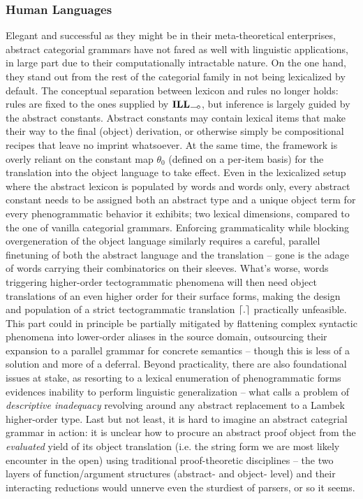 \subsubsection{Human Languages}
Elegant and successful as they might be in their meta-theoretical enterprises, abstract categorial grammars have not fared as well with linguistic applications, in large part due to their computationally intractable nature.
On the one hand, they stand out from the rest of the categorial family in not being lexicalized by default.
The conceptual separation between lexicon and rules no longer holds: rules are fixed to the ones supplied by $\ILL_{\li}$, but inference is largely guided by the abstract constants.
Abstract constants may contain lexical items that make their way to the final (object) derivation, or otherwise simply be compositional recipes that leave no imprint whatsoever.
At the same time, the framework is overly reliant on the constant map $\theta_0$ (defined on a per-item basis) for the translation into the object language to take effect.
Even in the lexicalized setup where the abstract lexicon is populated by words and words only, every abstract constant needs to be assigned both an abstract type and a unique object term for every phenogrammatic behavior it exhibits; two lexical dimensions, compared to the one of vanilla categorial grammars.
Enforcing grammaticality while blocking overgeneration of the object language similarly requires a careful, parallel finetuning of both the abstract language and the translation --  gone is the adage of words carrying their combinatorics on their sleeves. 
What's worse, words triggering higher-order tectogrammatic phenomena will then need object translations of an even higher order for their surface forms, making the design and population of a strict tectogrammatic translation $\lceil{.}\rceil$ practically unfeasible.
This part could in principle be partially mitigated by flattening complex syntactic phenomena into lower-order aliases in the source domain, outsourcing their expansion to a parallel grammar for concrete semantics -- though this is less of a solution and more of a deferral.
Beyond practicality, there are also foundational issues at stake, as resorting to a lexical enumeration of phenogrammatic forms evidences inability to perform linguistic generalization -- what \citet{moot2014hybrid} calls a problem of \textit{descriptive inadequacy} revolving around any abstract replacement to a Lambek higher-order type.
Last but not least, it is hard to imagine an abstract categrial grammar in action: it is unclear how to procure an abstract proof object from the \textit{evaluated} yield of its object translation (i.e. the string form we are most likely encounter in the open) using traditional proof-theoretic disciplines -- the two layers of function/argument structures (abstract- and object- level) and their interacting reductions would unnerve even the sturdiest of parsers, or so it seems.
